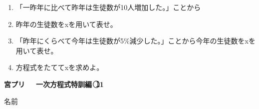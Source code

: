 \documentclass[a4paper,fleqn,papersize,15pt]{jsarticle}
\begin{document}
\begin{itemize}
\begin{enumerate}
\begin{enumerate}
\item 「一昨年に比べて昨年は生徒数が10人増加した。」ことから  \vfill \begin{flushright}\framebox[8em]{\rule{0pt}{6ex}}\end{flushright} %
\item 昨年の生徒数をxを用いて表せ。 \vfill \begin{flushright}\framebox[8em]{\rule{0pt}{6ex}}\end{flushright} %
\item 「昨年にくらべて今年は生徒数が5\%減少した。」ことから今年の生徒数をxを用いて表せ。 \vfill \begin{flushright}\framebox[8em]{\rule{0pt}{6ex}}\end{flushright} %
\item 方程式をたててxを求めよ。 \vfill \begin{flushright}\framebox[8em]{\rule{0pt}{6ex}}\end{flushright} %
\end{enumerate}
\end{enumerate}
    \vfill
\end{itemize}
\clearpage
 \begin{center}
   \LARGE\textbf{宮プリ　~一次方程式特訓編~\textcircled{\scriptsize 11}}
     \begin{flushright}
       名前\underline{\hspace{8zw}}
     \end{flushright}
 \end{center}
\end{document}
